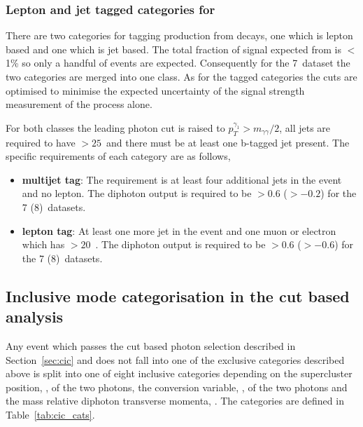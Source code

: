 \subsubsection{Lepton and jet tagged categories for \ttH}
\label{sec:tth_tag}

There are two categories for tagging production from \ttH decays, one which is lepton based and one which is jet based. The total fraction of signal expected from \ttH is $<$1\% so only a handful of events are expected. Consequently for the 7~\TeV dataset the two categories are merged into one class. As for the \VH tagged categories the cuts are optimised to minimise the expected uncertainty of the signal strength measurement of the \ttH process alone.

For both classes the leading photon \pT cut is raised to $p_{T}^{\gamma_{1}}>m_{\gamma\gamma}/2$, all jets are required to have \pT$>25$~\GeV and there must be at least one b-tagged jet present. The specific requirements of each category are as follows,

\begin{itemize}
  \item \textbf{\ttH multijet tag}: The requirement is at least four additional jets in the event and no lepton. The diphoton \BDT output is required to be $>0.6$ ($>-0.2$) for the 7 (8)~\TeV datasets. 
  \item \textbf{\ttH lepton tag}: At least one more jet in the event and one muon or electron which has \pT$>20$~\GeV. The diphoton \BDT output is required to be $>0.6$ ($>-0.6$) for the 7 (8)~\TeV datasets.  
\end{itemize}

\subsection{Inclusive mode categorisation in the cut based analysis}
\label{sec:inclusive_cats_cic}

Any event which passes the cut based photon selection described in Section~\ref{sec:cic} and does not fall into one of the exclusive categories described above is split into one of eight inclusive categories depending on the supercluster position, \eta, of the two photons, the conversion variable, \rnine, of the two photons and the mass relative diphoton transverse momenta, \pToM. The categories are defined in Table~\ref{tab:cic_cats}.

